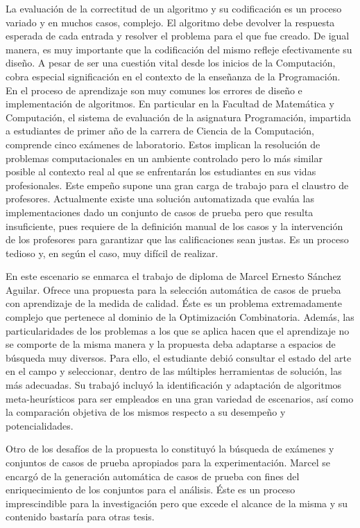 \documentclass[a4paper,openright,11pt,oneside]{book}
\begin{document}
	La evaluación de la correctitud de un algoritmo y su codificación es un proceso variado y en muchos casos, complejo. El algoritmo debe devolver la respuesta esperada de cada entrada y resolver el problema para el que fue creado. De igual manera, es muy importante que la codificación del mismo refleje efectivamente su diseño. A pesar de ser una cuestión vital desde los inicios de la Computación, cobra especial significación en el contexto de la enseñanza de la Programación. En el proceso de aprendizaje son muy comunes los errores de diseño e implementación de algoritmos. En particular en la Facultad de Matemática y Computación, el sistema de evaluación de la asignatura Programación, impartida a estudiantes de primer año de la carrera de Ciencia de la Computación, comprende cinco exámenes de laboratorio. Estos implican la resolución de problemas computacionales en un ambiente controlado pero lo más similar posible al contexto real al que se enfrentarán los estudiantes en sus vidas profesionales. Este empeño supone una gran carga de trabajo para el claustro de profesores. Actualmente existe una solución automatizada que evalúa las implementaciones dado un conjunto de casos de prueba pero que resulta insuficiente, pues requiere de la definición manual de los casos y la intervención de los profesores para garantizar que las calificaciones sean justas. Es un proceso tedioso y, en según el caso, muy difícil de realizar.
	
	En este escenario se enmarca el trabajo de diploma de Marcel Ernesto Sánchez Aguilar. Ofrece una propuesta para la selección automática de casos de prueba con aprendizaje de la medida de calidad. Éste es un problema extremadamente complejo que pertenece al dominio de la Optimización Combinatoria. Además, las particularidades de los problemas a los que se aplica hacen que el aprendizaje no se comporte de la misma manera y la propuesta deba adaptarse a espacios de búsqueda muy diversos. Para ello, el estudiante debió consultar el estado del arte en el campo y seleccionar, dentro de las múltiples herramientas de solución, las más adecuadas. Su trabajó incluyó la identificación y adaptación de algoritmos meta-heurísticos para ser empleados en una gran variedad de escenarios, así como la comparación objetiva de los mismos respecto a su desempeño y potencialidades.
	
	
	Otro de los desafíos de la propuesta lo constituyó la búsqueda de exámenes y conjuntos de casos de prueba apropiados para la experimentación. Marcel se encargó de la generación automática de casos de prueba con fines del enriquecimiento de los conjuntos para el análisis. Éste es un proceso imprescindible para la investigación pero que excede el alcance de la misma y su contenido bastaría para otras tesis. 
\end{document}
